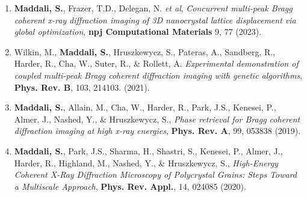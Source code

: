 \begin{enumerate}
    \item \textbf{Maddali, S.}, Frazer, T.D., Delegan, N. \emph{et al}, \emph{Concurrent multi-peak Bragg coherent x-ray diffraction imaging of 3D nanocrystal lattice displacement via global optimization}, \textbf{npj Computational Materials} 9, 77 (2023).
    \item Wilkin, M., \textbf{Maddali, S.}, Hruszkewycz, S., Pateras, A., Sandberg, R., Harder, R., Cha, W., Suter, R., \& Rollett, A. \emph{Experimental demonstration of coupled multi-peak Bragg coherent diffraction imaging with genetic algorithms}, \textbf{Phys. Rev. B}, 103, 214103. (2021).
    \item \textbf{Maddali, S.}, Allain, M., Cha, W., Harder, R., Park, J.S., Kenesei, P., Almer, J., Nashed, Y., \& Hruszkewycz, S., \emph{Phase retrieval for Bragg coherent diffraction imaging at high x-ray energies}, \textbf{Phys. Rev. A}, 99, 053838 (2019).
    \item \textbf{Maddali, S.}, Park, J.S., Sharma, H., Shastri, S., Kenesei, P., Almer, J., Harder, R., Highland, M., Nashed, Y., \& Hruszkewycz, S., \emph{High-Energy Coherent X-Ray Diffraction Microscopy of Polycrystal Grains: Steps Toward a Multiscale Approach}, \textbf{Phys. Rev. Appl.}, 14, 024085 (2020).

\end{enumerate}
